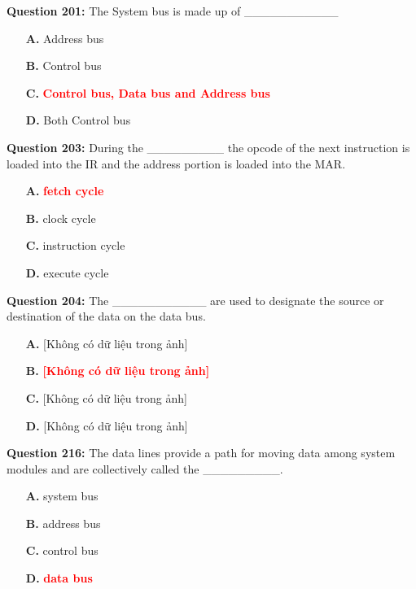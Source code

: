 \documentclass[12pt,a4paper]{article}
\begin{document}
\vspace{0.5cm}

\textbf{Question 201:} The System bus is made up of ___________

\begin{itemize}
    \item[\textbf{A.}] Address bus
    \item[\textbf{B.}] Control bus
    \item[\textbf{C.}] \textcolor{red}{\textbf{Control bus, Data bus and Address bus}}
    \item[\textbf{D.}] Both Control bus
\end{itemize}

\vspace{0.5cm}

\textbf{Question 203:} During the _________ the opcode of the next instruction is loaded into the IR and the address portion is loaded into the MAR.

\begin{itemize}
    \item[\textbf{A.}] \textcolor{red}{\textbf{fetch cycle}}
    \item[\textbf{B.}] clock cycle
    \item[\textbf{C.}] instruction cycle
    \item[\textbf{D.}] execute cycle
\end{itemize}

\vspace{0.5cm}

\textbf{Question 204:} The ___________ are used to designate the source or destination of the data on the data bus.

\begin{itemize}
    \item[\textbf{A.}] [Không có dữ liệu trong ảnh]
    \item[\textbf{B.}] \textcolor{red}{\textbf{[Không có dữ liệu trong ảnh]}}
    \item[\textbf{C.}] [Không có dữ liệu trong ảnh]
    \item[\textbf{D.}] [Không có dữ liệu trong ảnh]
\end{itemize}

\vspace{0.5cm}

\textbf{Question 216:} The data lines provide a path for moving data among system modules and are collectively called the _________.

\begin{itemize}
    \item[\textbf{A.}] system bus
    \item[\textbf{B.}] address bus
    \item[\textbf{C.}] control bus
    \item[\textbf{D.}] \textcolor{red}{\textbf{data bus}}
\end{itemize}
\end{document}
